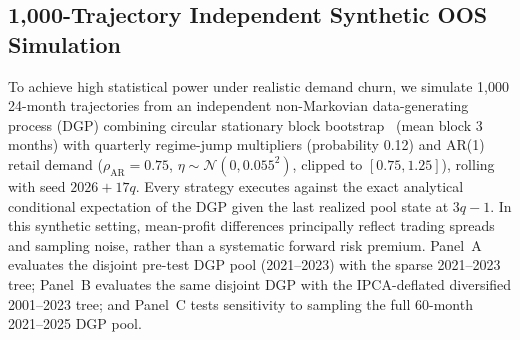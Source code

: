 \documentclass[10pt,journal]{IEEEtran}
\begin{document}
\subsection{1,000-Trajectory Independent Synthetic OOS Simulation}
To achieve high statistical power under realistic demand churn, we simulate 1,000 24-month trajectories from an independent non-Markovian data-generating process (DGP) combining circular stationary block bootstrap~\cite{PolitisRomano1994} (mean block 3 months) with quarterly regime-jump multipliers (probability 0.12) and AR(1) retail demand ($\rho_{\text{AR}} = 0.75$, $\eta \sim \mathcal{N}(0, 0.055^2)$, clipped to $[0.75, 1.25]$), rolling with seed $2026 + 17q$. Every strategy executes against the exact analytical conditional expectation of the DGP given the last realized pool state at $3q-1$. In this synthetic setting, mean-profit differences principally reflect trading spreads and sampling noise, rather than a systematic forward risk premium. Panel~A evaluates the disjoint pre-test DGP pool (2021--2023) with the sparse 2021--2023 tree; Panel~B evaluates the same disjoint DGP with the IPCA-deflated diversified 2001--2023 tree; and Panel~C tests sensitivity to sampling the full 60-month 2021--2025 DGP pool.
\end{document}
